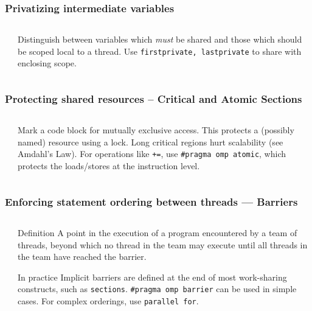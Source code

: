 \documentclass[handout]{beamer}
\begin{document}
\begin{frame}[fragile]
  \frametitle{Privatizing intermediate variables}
  \begin{columns}[t]%
    \begin{column}{0.6\textwidth}
    \end{column}
    \begin{column}{0.4\textwidth}
      Distinguish between variables which \emph{must} be shared and those which should be scoped local to a thread. Use \texttt{firstprivate, lastprivate} to share with enclosing scope. 
    \end{column}
  \end{columns}
\end{frame}


\begin{frame}[fragile]
  \frametitle{Protecting shared resources -- Critical and Atomic Sections}
  \begin{columns}[t]
    \begin{column}{0.7\textwidth}
    \end{column}
    \begin{column}{0.4\textwidth}
      Mark a code block for mutually exclusive access. This protects a (possibly named) resource using a lock. Long critical regions hurt scalability (see Amdahl's Law). For operations like \texttt{+=}, use \texttt{\#pragma omp atomic}, which protects the loads/stores at the instruction level.
      
    \end{column}
  \end{columns}
\end{frame}


\begin{frame}[fragile]
  \frametitle{Enforcing statement ordering between threads --- Barriers}
  \begin{columns}[t]%
    \begin{column}{0.55\textwidth}
    \end{column}
    \pause
    \begin{column}{0.5\textwidth}
      \begin{block}{Definition}
      A point in the execution of a program encountered by a team of threads, beyond which no thread in the team may execute until all threads in the team have reached the barrier.
      \end{block}
      \begin{block}{In practice}
        Implicit barriers are defined at the end of most work-sharing constructs, such as \texttt{sections}. \texttt{\#pragma omp barrier} can be used in simple cases. For complex orderings, use \texttt{parallel for}.
      \end{block}
    \end{column}
  \end{columns}
\end{frame}
\end{document}
